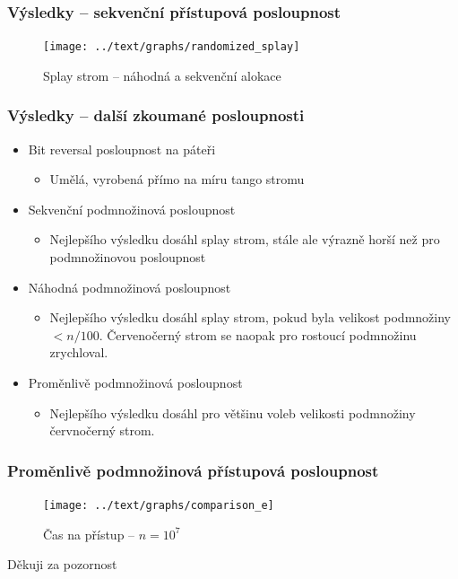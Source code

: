 \documentclass{beamer}
\begin{document}
\begin{frame}
\frametitle{Výsledky -- sekvenční přístupová posloupnost}
\begin{figure}[h!]
  \centering
  \texttt{[image: ../text/graphs/randomized\_splay]}
\caption{Splay strom -- náhodná a sekvenční alokace} 
\end{figure}
\end{frame}


\begin{frame}
\frametitle{Výsledky -- další zkoumané posloupnosti}
\begin{itemize}

\item Bit reversal posloupnost na páteři
\begin{itemize}
\item Umělá, vyrobená přímo na míru tango stromu
\end{itemize}

\item Sekvenční podmnožinová posloupnost
\begin{itemize}
\item Nejlepšího výsledku dosáhl splay strom, stále ale výrazně horší než pro  podmnožinovou posloupnost
\end{itemize}

\item Náhodná podmnožinová posloupnost
\begin{itemize}
\item Nejlepšího výsledku dosáhl splay strom, pokud byla velikost podmnožiny $<n/100$. Červenočerný strom se naopak pro rostoucí podmnožinu zrychloval.
\end{itemize}

\item Proměnlivě podmnožinová posloupnost
\begin{itemize}
\item Nejlepšího výsledku dosáhl pro většinu voleb velikosti podmnožiny červnočerný strom.
\end{itemize}

\end{itemize}
\end{frame}


\begin{frame}
\frametitle{Proměnlivě podmnožinová přístupová posloupnost}
\begin{figure}[h!]
  \centering
  \texttt{[image: ../text/graphs/comparison\_e]}
\caption{Čas na přístup -- $n=10^7$} 
\end{figure}
\end{frame}

\begin{frame}
\Huge{\centerline{Děkuji za pozornost}}
\end{frame}

\end{document}
